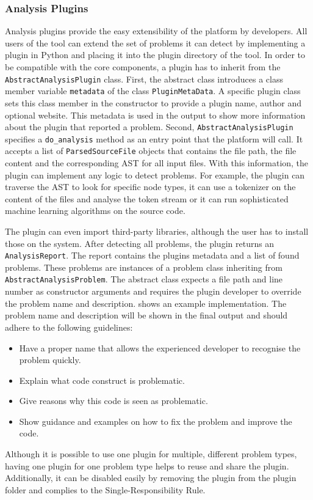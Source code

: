 \subsubsection{Analysis Plugins}\label{sec:analysis_plugins}
Analysis plugins provide the easy extensibility of the platform by developers. All users of the tool can extend the set of problems it can detect by implementing a plugin in Python and placing it into the plugin directory of the tool. In order to be compatible with the core components, a plugin has to inherit from the \texttt{AbstractAnalysisPlugin} class. First, the abstract class introduces a class member variable \texttt{metadata} of the class \texttt{PluginMetaData}. A specific plugin class sets this class member in the constructor to provide a plugin name, author and optional website. This metadata is used in the output to show more information about the plugin that reported a problem. Second, \texttt{AbstractAnalysisPlugin} specifies a \texttt{do\_analysis} method as an entry point that the platform will call. It accepts a list of \texttt{ParsedSourceFile} objects that contains the file path, the file content and the corresponding AST for all input files. With this information, the plugin can implement any logic to detect problems. 
For example, the plugin can traverse the AST to look for specific node types, it can use a tokenizer on the content of the files and analyse the token stream or it can run sophisticated machine learning algorithms on the source code.

The plugin can even import third-party libraries, although the user has to install those on the system. After detecting all problems, the plugin returns an \texttt{AnalysisReport}. The report contains the plugins metadata and a list of found problems. 
These problems are instances of a problem class inheriting from \texttt{AbstractAnalysis\-Problem}. The abstract class expects a file path and line number as constructor arguments and requires the plugin developer to override the problem name and description.  shows an example implementation. The problem name and description will be shown in the final output and should adhere to the following guidelines:

\begin{itemize}
    \item Have a proper name that allows the experienced developer to recognise the problem quickly.
    \item Explain what code construct is problematic.
    \item Give reasons why this code is seen as problematic.
    \item Show guidance and examples on how to fix the problem and improve the code.
\end{itemize}
Although it is possible to use one plugin for multiple, different problem types, having one plugin for one problem type helps to reuse and share the plugin. Additionally, it can be disabled easily by removing the plugin from the plugin folder and complies to the Single-Responsibility Rule.


